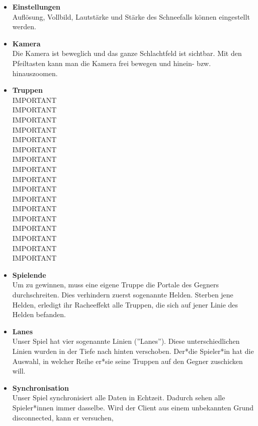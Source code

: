 \begin{itemize}
\begin{itemize}
        \end{itemize}
    \item \textbf{Einstellungen} \\
        Auflösung, Vollbild, Lautstärke und Stärke des Schneefalls können eingestellt werden.
    \item \textbf{Kamera} \\
        Die Kamera ist beweglich und das ganze Schlachtfeld ist sichtbar. Mit den Pfeiltasten kann man die Kamera frei bewegen und hinein- bzw. hinauszoomen.
    \item \textbf{Truppen} \\
        IMPORTANT\\
        IMPORTANT\\
        IMPORTANT\\
        IMPORTANT\\
        IMPORTANT\\
        IMPORTANT\\
        IMPORTANT\\
        IMPORTANT\\
        IMPORTANT\\
        IMPORTANT\\
        IMPORTANT\\
        IMPORTANT\\
        IMPORTANT\\
        IMPORTANT\\
        IMPORTANT\\
        IMPORTANT\\
        IMPORTANT\\
    \item \textbf{Spielende} \\
        Um zu gewinnen, muss eine eigene Truppe die Portale des Gegners durchschreiten. Dies verhindern zuerst sogenannte Helden. Sterben jene Helden, erledigt ihr Racheeffekt alle
        Truppen, die sich auf jener Linie des Helden befanden.
    \item \textbf{Lanes} \\
        Unser Spiel hat vier sogenannte Linien (''Lanes''). Diese unterschiedlichen Linien wurden in der Tiefe nach hinten verschoben. Der*die Spieler*in hat die Auswahl, in welcher Reihe er*sie seine Truppen auf den Gegner zuschicken will.
    \item \textbf{Synchronisation} \\
        Unser Spiel synchronisiert alle Daten in Echtzeit. Dadurch sehen alle Spieler*innen immer dasselbe. Wird der Client aus einem unbekannten Grund disconnected, kann er versuchen,

\end{itemize}
